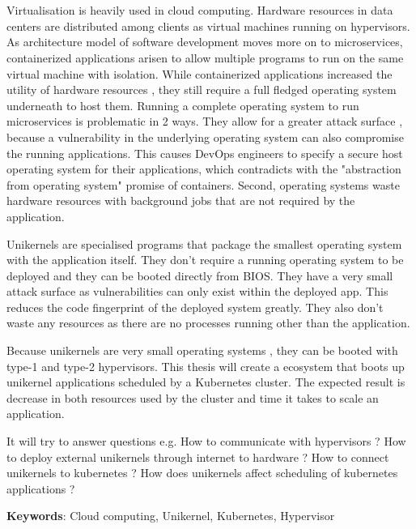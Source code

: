 \chapter{\abstractname}


Virtualisation is heavily used in cloud computing. Hardware resources in data centers are distributed among clients as virtual machines running on hypervisors. As architecture model of software development moves more on to microservices, containerized applications arisen to allow multiple programs to run on the same virtual machine with isolation. While containerized applications increased the utility of hardware resources , they still require a full fledged operating system underneath to host them.
Running a complete operating system to run microservices is problematic in 2 ways. They allow for a greater attack surface , because a vulnerability in the underlying operating system can also compromise the running applications. This causes DevOps engineers to specify a secure host operating system for their applications, which contradicts with the "abstraction from operating system" promise of containers. Second, operating systems waste hardware resources with background jobs that are not required by the application. 

Unikernels are specialised programs that package the smallest operating system with the application itself. They don't require a running operating system to be deployed and they can be booted directly from BIOS. They have a very small attack surface as vulnerabilities can only exist within the deployed app. This reduces the code fingerprint of the deployed system greatly. They also don't waste any resources as there are no processes running other than the application. 

Because unikernels are very small operating systems , they can be booted with type-1 and type-2 hypervisors. This thesis will create a ecosystem that boots up unikernel applications scheduled by a Kubernetes cluster. The expected result is  decrease in both resources used by the cluster and time it takes to scale an application.

It will try to answer questions e.g. How to communicate with hypervisors ? How to deploy external unikernels through internet to hardware ? How to connect unikernels to kubernetes ? How does unikernels affect scheduling of kubernetes applications ?

 \textbf{Keywords}: Cloud computing, Unikernel, Kubernetes, Hypervisor
